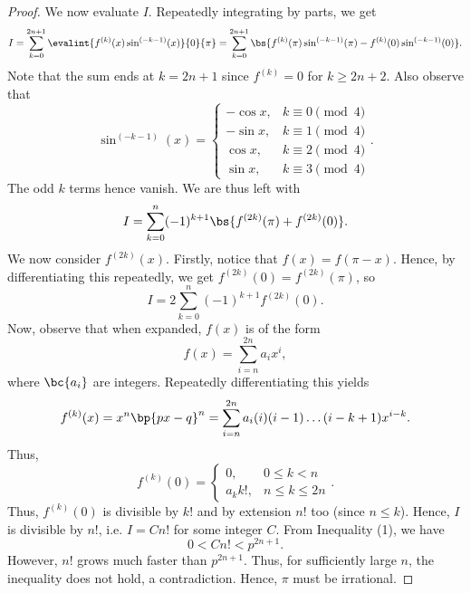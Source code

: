 \begin{proof}
    We now evaluate $I$. Repeatedly integrating by parts, we get \[I = \sum_{k = 0}^{2n+1} \evalint{f^{(k)}(x) \sin^{(-k-1)} (x)}{0}{\pi} = \sum_{k = 0}^{2n+1} \bs{f^{(k)}(\pi) \sin^{(-k-1)}(\pi) - f^{(k)}(0) \sin^{(-k-1)}(0)}.\] Note that the sum ends at $k = 2n+1$ since $f^{(k)} = 0$ for $k \geq 2n+2$. Also observe that \[\sin^{(-k-1)}(x) = \begin{cases}
        -\cos x, & k \equiv 0 \pmod{4}\\
        -\sin x, & k \equiv 1 \pmod{4}\\
        \cos x, & k \equiv 2 \pmod{4}\\
        \sin x, & k \equiv 3 \pmod{4}
    \end{cases}.\]
    The odd $k$ terms hence vanish. We are thus left with \[I = \sum_{k = 0}^{n} (-1)^{k+1} \bs{f^{(2k)}(\pi) + f^{(2k)}(0)}.\] We now consider $f^{(2k)}(x)$. Firstly, notice that $f(x) = f(\pi - x)$. Hence, by differentiating this repeatedly, we get $f^{(2k)}(0) = f^{(2k)}(\pi)$, so \[I = 2 \sum_{k = 0}^{n} (-1)^{k+1} f^{(2k)}(0).\] Now, observe that when expanded, $f(x)$ is of the form \[f(x) = \sum_{i = n}^{2n} a_i x^{i},\] where $\bc{a_i}$ are integers. Repeatedly differentiating this yields \[f^{(k)}(x) = x^n \bp{px - q}^n = \sum_{i = n}^{2n} a_i (i)(i-1)\dots(i-k+1) x^{i - k}.\] Thus, \[f^{(k)}(0) = \begin{cases}
        0, & 0 \leq k < n\\
        a_k k!, & n \leq k \leq 2n
    \end{cases}.\]
    Thus, $f^{(k)}(0)$ is divisible by $k!$ and by extension $n!$ too (since $n \leq k$). Hence, $I$ is divisible by $n!$, i.e. $I = Cn!$ for some integer $C$. From Inequality (1), we have \[0 < C n! < p^{2n+1}.\] However, $n!$ grows much faster than $p^{2n+1}$. Thus, for sufficiently large $n$, the inequality does not hold, a contradiction. Hence, $\pi$ must be irrational.
\end{proof}


